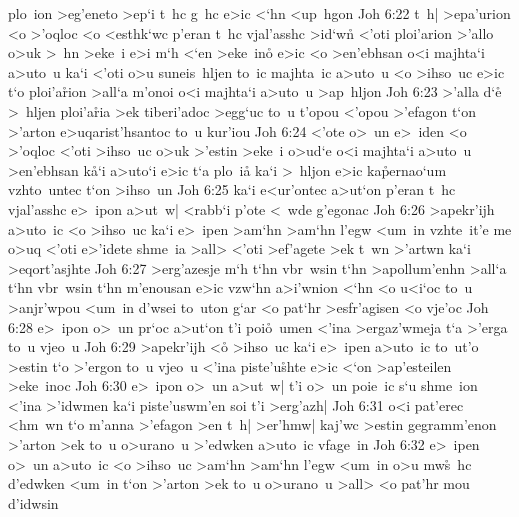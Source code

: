 plo~ion
>eg'eneto
>ep`i
t~hc
g~hc
e>ic
<`hn
<up~hgon\bibvsend
\vs Joh 6:22
t~h|
>epa'urion
<o
>'oqloc
<o
<esthk`wc
p'eran
t~hc
vjal'asshc
>id`w\r{n}
<'oti
ploi'arion
>'allo
o>uk
>~hn
>eke~i
e>i
m`h
<`en
>eke~ino\r{}
e>ic
<o
>en'ebhsan
o<i
majhta`i
a>uto~u
ka`i
<'oti
o>u
suneis~hljen
to~ic
majhta~ic
a>uto~u
<o
>ihso~uc
e>ic
t`o
ploi'a\r{r}ion
>all`a
m'onoi
o<i
majhta`i
a>uto~u
>ap~hljon\bibvsend
\vs Joh 6:23
>'alla
d`e\r{}
>~hljen
ploi'a\r{r}ia
>ek
tiberi'adoc
>egg`uc
to~u
t'opou
<'opou
>'efagon
t`on
>'arton
e>uqarist'hsantoc
to~u
kur'iou\bibvsend
\vs Joh 6:24
<'ote
o>~un
e>~iden
<o
>'oqloc
<'oti
>ihso~uc
o>uk
>'estin
>eke~i
o>ud`e
o<i
majhta`i
a>uto~u
>en'ebhsan
k\r{a}`i
a>uto`i
e>ic
t`a
plo~i\r{a}
ka`i
>~hljon
e>ic
ka\r{p}ernao`um
vzhto~untec
t`on
>ihso~un\bibvsend
\vs Joh 6:25
ka`i
e<ur'ontec
a>ut`on
p'eran
t~hc
vjal'asshc
e>~ipon
a>ut~w|
<rabb`i
p'ote
<~wde
g'egonac\bibvsend
\vs Joh 6:26
>apekr'ijh
a>uto~ic
<o
>ihso~uc
ka`i
e>~ipen
>am`hn
>am`hn
l'egw
<um~in
vzhte~it'e
me
o>uq
<'oti
e>'idete
shme~ia
>all>
<'oti
>ef'agete
>ek
t~wn
>'artwn
ka`i
>eqort'asjhte\bibvsend
\vs Joh 6:27
>erg'azesje
m`h
t`hn
vbr~wsin
t`hn
>apollum'enhn
>all`a
t`hn
vbr~wsin
t`hn
m'enousan
e>ic
vzw`hn
a>i'wnion
<`hn
<o
u<i`oc
to~u
>anjr'wpou
<um~in
d'wsei
to~uton
g`ar
<o
pat`hr
>esfr'agisen
<o
vje'oc\bibvsend
\vs Joh 6:28
e>~ipon
o>~un
pr`oc
a>ut`on
t'i
poi\r{o}~umen
<'ina
>ergaz'wmeja
t`a
>'erga
to~u
vjeo~u\bibvsend
\vs Joh 6:29
>apekr'ijh
<o\r{}
>ihso~uc
ka`i
e>~ipen
a>uto~ic
to~ut'o
>estin
t`o
>'ergon
to~u
vjeo~u
<'ina
piste'u\r{s}hte
e>ic
<`on
>ap'esteilen
>eke~inoc\bibvsend
\vs Joh 6:30
e>~ipon
o>~un
a>ut~w|
t'i
o>~un
poie~ic
s`u
shme~ion
<'ina
>'idwmen
ka`i
piste'uswm'en
soi
t'i
>erg'azh|\bibvsend
\vs Joh 6:31
o<i
pat'erec
<hm~wn
t`o
m'anna
>'efagon
>en
t~h|
>er'hmw|
kaj'wc
>estin
gegramm'enon
>'arton
>ek
to~u
o>urano~u
>'edwken
a>uto~ic
vfage~in\bibvsend
\vs Joh 6:32
e>~ipen
o>~un
a>uto~ic
<o
>ihso~uc
>am`hn
>am`hn
l'egw
<um~in
o>u
mw\r{s}~hc
d'edwken
<um~in
t`on
>'arton
>ek
to~u
o>urano~u
>all>
<o
pat'hr
mou
d'idwsin
